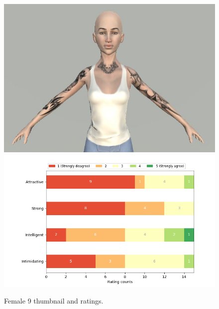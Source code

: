 \begin{figure}[H]
  \includegraphics[width=\linewidth]{Images/Females/9.JPG}
\endminipage\hfill
{}
  \includegraphics[width=\linewidth]{Survey/FRatings/avatar_f9.png}
\endminipage\hfill
\caption{Female 9 thumbnail and ratings.}
\end{figure}


